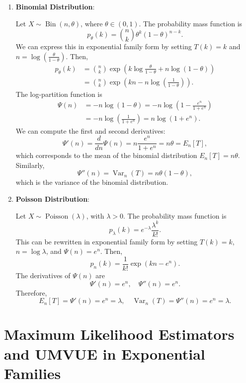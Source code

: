 \documentclass[open=any, 11pt,paper=A4]{scrreprt}
\begin{document}
\begin{enumerate}
    \item \textbf{Binomial Distribution}:

    Let $X \sim \operatorname{Bin}(n, \theta)$, where $\theta \in (0,1)$. The probability mass function is
    \[
    p_\theta(k) = \binom{n}{k} \theta^k (1 - \theta)^{n - k}.
    \]
    We can express this in exponential family form by setting $T(k) = k$ and $n = \log \left( \frac{\theta}{1 - \theta} \right)$. Then,
    \begin{align*}
    p_\theta(k) &= \binom{n}{k} \exp\left( k \log \frac{\theta}{1 - \theta} + n \log(1 - \theta) \right) \\
    &= \binom{n}{k} \exp\left( k n - n \log \left( \frac{1}{1 - \theta} \right) \right).
    \end{align*}
    The log-partition function is
    \begin{align*}
    \Psi(n) &= -n \log(1 - \theta) = -n \log\left( 1 - \frac{e^n}{1 + e^n} \right) \\
    &= -n \log\left( \frac{1}{1 + e^n} \right) = n \log(1 + e^n).
    \end{align*}
    We can compute the first and second derivatives:
    \[
    \Psi'(n) = \frac{d}{dn} \Psi(n) = n \frac{e^n}{1 + e^n} = n \theta = E_n[T],
    \]
    which corresponds to the mean of the binomial distribution $E_n[T] = n \theta$. Similarly,
    \[
    \Psi''(n) = \operatorname{Var}_n(T) = n \theta (1 - \theta),
    \]
    which is the variance of the binomial distribution.

    \item \textbf{Poisson Distribution}:

    Let $X \sim \operatorname{Poisson}(\lambda)$, with $\lambda > 0$. The probability mass function is
    \[
    p_\lambda(k) = e^{-\lambda} \frac{\lambda^k}{k!}.
    \]
    This can be rewritten in exponential family form by setting $T(k) = k$, $n = \log \lambda$, and $\Psi(n) = e^n$. Then,
    \[
    p_n(k) = \frac{1}{k!} \exp\left( k n - e^n \right).
    \]
    The derivatives of $\Psi(n)$ are
    \[
    \Psi'(n) = e^n, \quad \Psi''(n) = e^n.
    \]
    Therefore,
    \[
    E_n[T] = \Psi'(n) = e^n = \lambda, \quad \operatorname{Var}_n(T) = \Psi''(n) = e^n = \lambda.
    \]
\end{enumerate}

\section{Maximum Likelihood Estimators and UMVUE in Exponential Families}
\end{document}
